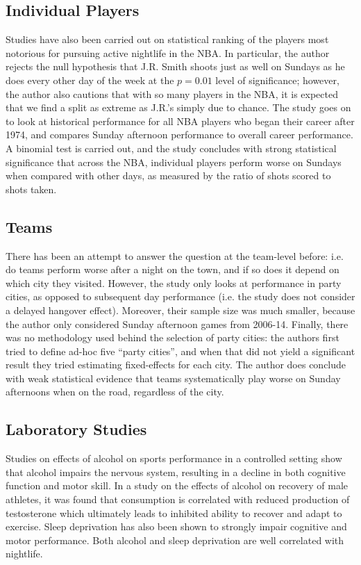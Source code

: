 \documentclass[letterpaper,12pt]{article}
\begin{document}
\subsection{Individual Players}
Studies have also been carried out on statistical ranking of the players
most notorious for pursuing active nightlife in the NBA.\citep{chase} In particular, 
the author rejects the null hypothesis that J.R. Smith shoots just as well on Sundays as he does
every other day of the week at the $p=0.01$ level of significance; however, the author also
cautions that with so many players in the NBA, it is expected that we find a split as extreme
as J.R.'s simply due to chance.
The study goes on to look
at historical performance for all NBA players who began their career after 1974, and compares
Sunday afternoon performance to overall career performance. A binomial test is carried out, and the 
study concludes with strong statistical significance that across the NBA, 
individual players perform worse on Sundays when compared with other days, 
as measured by the ratio of shots scored to shots taken.

\subsection{Teams}
There has been an attempt to answer the question at the team-level before: i.e. do teams perform
worse after a night on the town, and if so does it depend on which city they 
visited.\citep{ezekowitz} However, the study only
looks at performance in party cities, as opposed to subsequent day performance (i.e. the study does not consider a delayed hangover effect). Moreover, their sample size was much smaller, because the author only considered Sunday afternoon games
from 2006-14. Finally, there was no methodology used behind the selection of party cities:
the authors first tried to define ad-hoc five ``party cities'', and when that did not yield
a significant result they tried estimating fixed-effects for each city. The author does conclude
with weak statistical evidence that teams systematically play worse on Sunday 
afternoons when on the road, regardless of the city.

\subsection{Laboratory Studies}
Studies on effects of alcohol on sports performance in a controlled setting
show that alcohol impairs the nervous system, resulting in a decline in both
cognitive function and motor skill.\citep{shirreffs} In a study on 
the effects of alcohol on recovery of male athletes, it was found that
consumption is correlated with reduced production of testosterone
which ultimately leads to inhibited ability to recover and adapt to exercise.\citep{mjbarnes}
Sleep deprivation has also been shown to strongly impair cognitive and motor performance.\citep{pilcher} Both alcohol and sleep deprivation are well correlated with nightlife.
\end{document}
